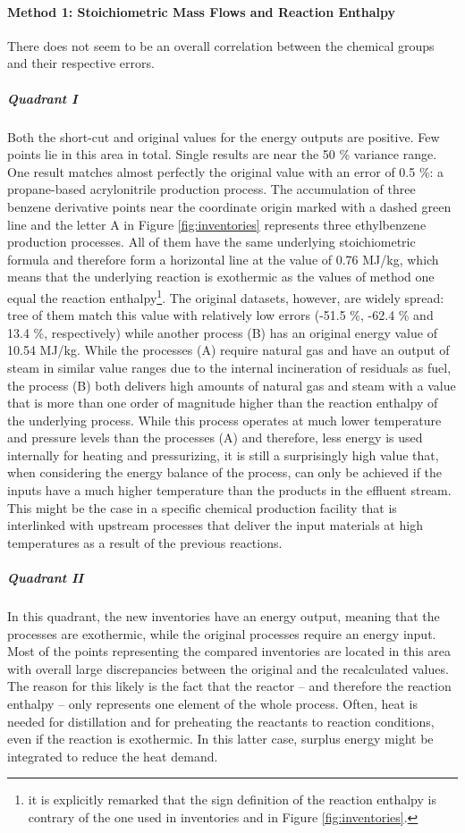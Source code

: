 \paragraph{Method 1: Stoichiometric Mass Flows and Reaction Enthalpy}
There does not seem to be an overall correlation between the chemical groups and their respective errors. 
\subparagraph{Quadrant I} 
Both the short-cut and original values for the energy outputs are positive. Few points lie in this area in total. Single results are near the 50 \% variance range. One result matches almost perfectly the original value with an error of 0.5 \%: a propane-based acrylonitrile production process. The accumulation of three benzene derivative points near the coordinate origin marked with a dashed green line and the letter A in Figure \ref{fig:inventories} represents three ethylbenzene production processes. All of them have the same underlying stoichiometric formula and therefore form a horizontal line at the value of 0.76 MJ/kg, which means that the underlying reaction is exothermic as the values of method one equal the reaction enthalpy\footnote{it is explicitly remarked that the sign definition of the reaction enthalpy is contrary of the one used in inventories and in Figure \ref{fig:inventories}.}. The original datasets, however, are widely spread: tree of them match this value with relatively low errors (-51.5 \%,	-62.4 \%	 and 13.4 \%, respectively) while another process (B) has an original energy value of 10.54 MJ/kg. While the processes (A) require natural gas and have an output of steam in similar value ranges due to the internal incineration of residuals as fuel, the process (B) both delivers high amounts of natural gas and steam with a value that is more than one order of magnitude higher than the reaction enthalpy of the underlying process. While this process operates at much lower temperature and pressure levels than the processes (A) and therefore, less energy is used internally for heating and pressurizing, it is still a surprisingly high value that, when considering the energy balance of the process, can only be achieved if the inputs have a much higher temperature than the products in the effluent stream. This might be the case in a specific chemical production facility that is interlinked with upstream processes that deliver the input materials at high temperatures as a result of the previous reactions.

\subparagraph{Quadrant II}
In this quadrant, the new inventories have an energy output, meaning that the processes are exothermic, while the original processes require an energy input. Most of the points representing the compared inventories are located in this area with overall large discrepancies between the original and the recalculated values. The reason for this likely is the fact that the reactor -- and therefore the reaction enthalpy -- only represents one element of the whole process. Often, heat is needed for distillation and for preheating the reactants to reaction conditions, even if the reaction is exothermic. In this latter case, surplus energy might be integrated to reduce the heat demand. 

